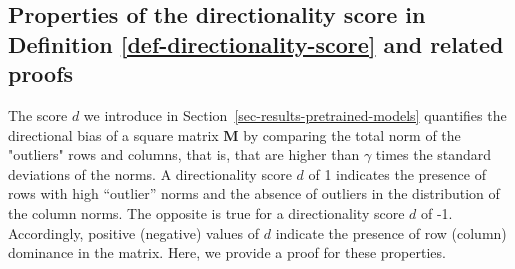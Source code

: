\subsection{Properties of the directionality score in Definition \ref{def-directionality-score} and related proofs}
\label{supp-math-directionality-score}
%
The score $d$ we introduce in Section~\ref{sec-results-pretrained-models} quantifies the directional bias of a square matrix $\bm{M}$ by comparing the total norm of the "outliers" rows and columns, that is, that are higher than $\gamma$ times the standard deviations of the norms.
%
A directionality score $d$ of 1 indicates the presence of rows with high ``outlier'' norms and the absence of outliers in the distribution of the column norms.  
%
The opposite is true for a directionality score $d$ of -1.
%
Accordingly, positive (negative) values of $d$ indicate the presence of row (column) dominance in the matrix.
%
Here, we provide a proof for these properties.
%

